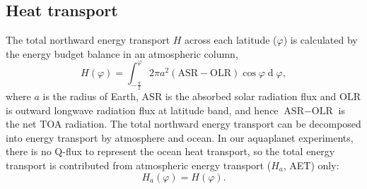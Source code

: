 
\subsection{Heat transport}
\label{sec:heat_transport}

 
The total northward energy transport $H$ across each latitude ($\varphi$) is calculated by the energy budget balance in an atmospheric column,
\begin{equation}
	H(\varphi) =  \int_{-\frac{\pi}{2}}^{\varphi}2\pi a^2(\text{ASR}-\text{OLR})\operatorname{cos}\varphi \operatorname{d}\varphi,
\end{equation}  
where $a$ is the radius of Earth, $\text{ASR}$ is the absorbed solar radiation flux and $\text{OLR}$ is outward longwave radiation flux at latitude band, and hence $\text{ASR}-\text{OLR}$ is the net TOA radiation. The total northward energy transport can be decomposed into energy transport by atmosphere and ocean. In our aquaplanet experiments, there is no Q-flux to represent the ocean heat transport, so the total energy transport is contributed from atmospheric energy transport ($H_{a}$, AET) only:
\begin{equation}
	H_a(\varphi) = H(\varphi).
\end{equation}

